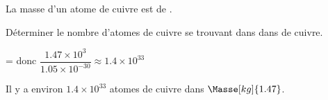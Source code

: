     La masse d’un atome de cuivre est de .

    Déterminer le nombre d'atomes de cuivre se trouvant dans dans  de cuivre.

    {\red {} =  donc $\dfrac{\num{1.47}\times 10^3}{\num{1.05}\times 10^{-30}}\approx \num{1.4}\times 10^{33}$

    Il y a environ $\num{1.4}\times 10^{33}$ atomes de cuivre dans $\Masse[kg]{1.47}$.}

